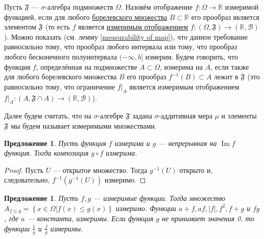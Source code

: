\documentclass[12pt]{article}
\newtheorem{proposition}[theorem]{Предложение}
\numberwithin{theorem}{section}
\theoremstyle{definition}
\newcommand{\RR}{\mathbb{R}}
\newcommand{\calB}{\mathcal{B}}
\newcommand{\defin}[2]{\hypertarget{#2}{{\color{red} #1}}}
\newcommand{\events}{\mathfrak{F}}
\newcommand{\Image}{\operatorname{Im}}
\newcommand{\defineset}[2]{\left\{
	\left.
	#1
	\right\vert
	#2
	\right\}}
\begin{document}
	Пусть $ \events $ --- $ \sigma $-алгебра подмножеств $ \Omega $.
	Назовём отображение $ f \colon \Omega \to \RR $ \defin{измеримой функцией}{measurable-function},
	если для любого \hyperlink{borel-sets}{борелевского множества} $ B \subset \RR $
	его прообраз является элементом $ \events $ (то есть $ f $ является \hyperlink{morphism-of-measurable-spaces}{измеримым отображением} 
	$ f \colon (\Omega, \events) \to (\RR, \calB) $).
	Можно показать (см. лемму \ref{measurability of map}), что данное требование равносильно тому, что прообраз любого интервала
	или тому, что прообраз любого бесконечного полуинтервала $ (-\infty, b] $ измерим.
	Будем говорить, что функция $ f $, определённая на подмножестве $ A \subset \Omega $,
	\defin{измерима на $ A $}{locally-measurable}, если также для любого борелевского множества $ B $ его прообраз $ f^{-1}(B) \subset A $ лежит в $ \events $ 
	(это равносильно тому, что ограничение $ \left.f\right|_{A} $ является измеримым отображением
	$ \left.f\right|_{A} \colon (A, \events \cap A) \to (\RR, \calB) $).
	
	Далее будем считать, что на $ \sigma $-алгебре $ \events $ задана $ \sigma $-аддитивная мера $ \mu $
	и элементы $ \events $ мы будем называет измеримыми множествами.
	
	\begin{proposition} \label{composition with continuous}
		Пусть функция $ f $ измерима и $ g $ --- непрерывная на $ \Image f $ функция.
		Тогда композиция $ g \circ f $ измерима.
	\end{proposition}
	
	\begin{proof}
		Пусть $ U $ --- открытое множество.
		Тогда $ g^{-1}(U) $ открыто и, следовательно, $ f^{-1}(g^{-1}(U)) $ измеримо.
	\end{proof}
	
	\begin{proposition} \label{measurable functions are good}
		Пусть $ f, g $ --- измеримые функции.
		Тогда множество $ A_{f \leqslant g} = \defineset{x \in \Omega}{f(x) \leqslant g(x)} $
		измеримо.
		Функции $ a + f, af, |f|, f^2, f + g $ и $ fg $, где $ a $ --- константа, измеримы.
		Если функция $ g $ не принимает значения 0, то функции $ \tfrac{1}{g} $ и $ \tfrac{f}{g} $
		измеримы.
	\end{proposition}
	
\end{document}
